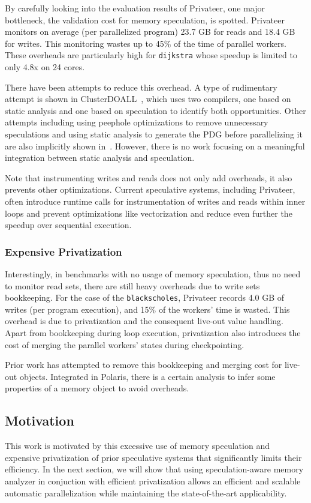 By carefully looking into the evaluation results of Privateer, one major
bottleneck, the validation cost for memory speculation, is spotted.
%
Privateer monitors on average (per parallelized program) 23.7 GB for reads
and 18.4 GB for writes. This monitoring wastes up to 45\% of the time of
parallel workers.
%
These overheads are particularly high for \texttt{dijkstra} whose
speedup is limited to only 4.8x on 24 cores.

There have been attempts to reduce this overhead. A type of rudimentary
attempt is shown in ClusterDOALL~\cite{kim:12:cgo}, which uses two
compilers, one based on static analysis and one based on speculation to
identify both opportunities. Other attempts including using peephole
optimizations to remove unnecessary speculations and using static analysis
to generate the PDG before parallelizing it are also implicitly shown
in~\cite{johnson:12:pldi,ctian:2008:micro}. However, there is no work
focusing on a meaningful integration between static analysis and
speculation.

Note that instrumenting writes and reads does not only add overheads, it
also prevents other optimizations. Current speculative systems, including
Privateer, often introduce runtime calls for instrumentation of writes and
reads within inner loops and prevent optimizations like vectorization and
reduce even further the speedup over sequential execution.

\subsubsection{Expensive Privatization}

Interestingly, in benchmarks with no usage of memory speculation, thus no
need to monitor read sets, there are still heavy overheads due to write
sets bookkeeping. For the case of the \texttt{blackscholes}, Privateer
records 4.0 GB of writes (per program execution), and 15\% of the workers'
time is wasted. This overhead is due to privatization and the consequent
live-out value handling.
%
Apart from bookkeeping during loop execution, privatization also introduces
the cost of merging the parallel workers' states during checkpointing.

Prior work has attempted to remove this bookkeeping and merging cost for
live-out objects. Integrated in Polaris, there is a certain analysis
\cite{tu:94:lcpc} to infer some properties of a memory object to avoid
overheads.


\subsection{Motivation}
This work is motivated by this excessive use of memory speculation and
expensive privatization of prior speculative systems that significantly
limits their efficiency.
%
In the next section, we will show that using speculation-aware memory
analyzer in conjuction with efficient privatization allows an efficient and
scalable automatic parallelization while maintaining the state-of-the-art
applicability.


